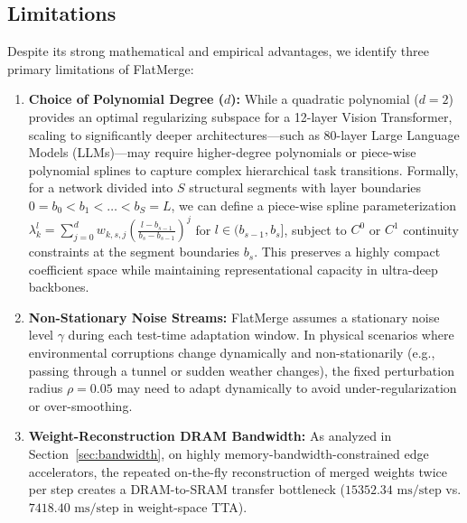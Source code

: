 \subsection{Limitations}
Despite its strong mathematical and empirical advantages, we identify three primary limitations of FlatMerge:
\begin{enumerate}
    \item \textbf{Choice of Polynomial Degree ($d$):} While a quadratic polynomial ($d=2$) provides an optimal regularizing subspace for a 12-layer Vision Transformer, scaling to significantly deeper architectures—such as 80-layer Large Language Models (LLMs)—may require higher-degree polynomials or piece-wise polynomial splines to capture complex hierarchical task transitions. Formally, for a network divided into $S$ structural segments with layer boundaries $0 = b_0 < b_1 < \dots < b_S = L$, we can define a piece-wise spline parameterization $\lambda^l_k = \sum_{j=0}^{d} w_{k, s, j} \left(\frac{l - b_{s-1}}{b_s - b_{s-1}}\right)^j$ for $l \in (b_{s-1}, b_s]$, subject to $C^0$ or $C^1$ continuity constraints at the segment boundaries $b_s$. This preserves a highly compact coefficient space while maintaining representational capacity in ultra-deep backbones.
    \item \textbf{Non-Stationary Noise Streams:} FlatMerge assumes a stationary noise level $\gamma$ during each test-time adaptation window. In physical scenarios where environmental corruptions change dynamically and non-stationarily (e.g., passing through a tunnel or sudden weather changes), the fixed perturbation radius $\rho = 0.05$ may need to adapt dynamically to avoid under-regularization or over-smoothing.
    \item \textbf{Weight-Reconstruction DRAM Bandwidth:} As analyzed in Section~\ref{sec:bandwidth}, on highly memory-bandwidth-constrained edge accelerators, the repeated on-the-fly reconstruction of merged weights twice per step creates a DRAM-to-SRAM transfer bottleneck ($15352.34\text{ ms/step}$ vs. $7418.40\text{ ms/step}$ in weight-space TTA).
\end{enumerate}

